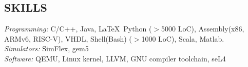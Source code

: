 \documentclass[margin, 10pt]{res} %
\begin{document}
\begin{resume}


\section{SKILLS } 

{\sl Programming:} C/C++, Java, \LaTeX\, Python ($>$5000 LoC), Assembly(x86, ARMv6, RISC-V), VHDL, Shell(Bash) ($>$1000 LoC), Scala, Matlab. \\
{\sl Simulators:} SimFlex, gem5 
\\
{\sl Software:} QEMU, Linux kernel, LLVM, GNU compiler toolchain, seL4




\end{resume}
\end{document}

